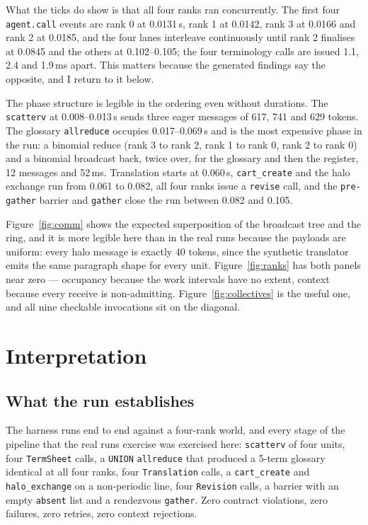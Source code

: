 \documentclass[11pt]{article}
\begin{document}
What the ticks do show is that all four ranks ran concurrently. The first four
\texttt{agent.call} events are rank 0 at 0.0131\,s, rank 1 at 0.0142, rank 3 at 0.0166 and rank 2
at 0.0185, and the four lanes interleave continuously until rank 2 finalises at 0.0845 and the
others at 0.102--0.105; the four terminology calls are issued 1.1, 2.4 and 1.9\,ms apart. This
matters because the generated findings say the opposite, and I return to it below.

The phase structure is legible in the ordering even without durations. The \texttt{scatterv} at
0.008--0.013\,s sends three eager messages of 617, 741 and 629 tokens. The glossary
\texttt{allreduce} occupies 0.017--0.069\,s and is the most expensive phase in the run: a
binomial reduce (rank 3 to rank 2, rank 1 to rank 0, rank 2 to rank 0) and a binomial broadcast
back, twice over, for the glossary and then the register, 12 messages and 52\,ms. Translation
starts at 0.060\,s, \texttt{cart\_create} and the halo exchange run from 0.061 to 0.082, all four
ranks issue a \texttt{revise} call, and the \texttt{pre-gather} barrier and \texttt{gather} close
the run between 0.082 and 0.105.

Figure~\ref{fig:comm} shows the expected superposition of the broadcast tree and the ring, and it
is more legible here than in the real runs because the payloads are uniform: every halo message is
exactly 40 tokens, since the synthetic translator emits the same paragraph shape for every unit.
Figure~\ref{fig:ranks} has both panels near zero --- occupancy because the work intervals have no
extent, context because every receive is non-admitting. Figure~\ref{fig:collectives} is the
useful one, and all nine checkable invocations sit on the diagonal.

\section{Interpretation}

\subsection*{What the run establishes}

The harness runs end to end against a four-rank world, and every stage of the pipeline that the
real runs exercise was exercised here: \texttt{scatterv} of four units, four \texttt{TermSheet}
calls, a \texttt{UNION} \texttt{allreduce} that produced a 5-term glossary identical at all four
ranks, four \texttt{Translation} calls, a \texttt{cart\_create} and \texttt{halo\_exchange} on a
non-periodic line, four \texttt{Revision} calls, a barrier with an empty \texttt{absent} list and
a rendezvous \texttt{gather}. Zero contract violations, zero failures, zero retries, zero context
rejections.
\end{document}
